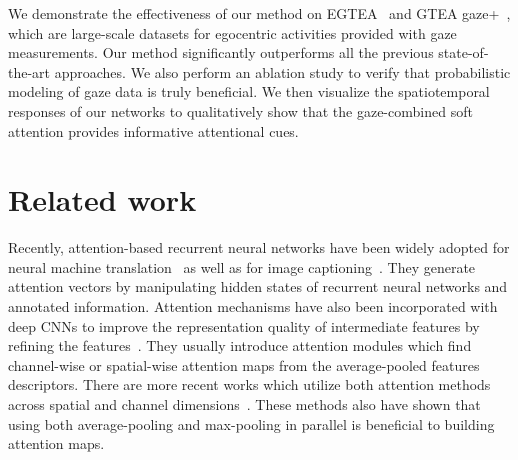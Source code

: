\documentclass[10pt,twocolumn,letterpaper]{article}
\begin{document}
We demonstrate the effectiveness of our method on EGTEA~\cite{li2018eye} and GTEA gaze+~\cite{li2015delving}, which are large-scale datasets for egocentric activities provided with gaze measurements. Our method significantly outperforms all the previous state-of-the-art approaches. We also perform an ablation study to verify that probabilistic modeling of gaze data is truly beneficial. We then visualize the spatiotemporal responses of our networks to qualitatively show that the gaze-combined soft attention provides informative attentional cues.

\section{Related work} \label{sec:related}
Recently, attention-based recurrent neural networks have been widely adopted for neural machine translation~\cite{bahdanau2014neural,luong2015effective} as well as for image captioning~\cite{xu2015show}. They generate attention vectors by manipulating hidden states of recurrent neural networks and annotated information. Attention mechanisms have also been incorporated with deep CNNs to improve the representation quality of intermediate features by refining the features~\cite{xu2016ask,oktay2018attention,hu2018squeeze,zhang2018image}. They usually introduce attention modules which find channel-wise or spatial-wise attention maps from the average-pooled features descriptors. There are more recent works which utilize both attention methods across spatial and channel dimensions~\cite{woo2018cbam,suganuma2018attention}. These methods also have shown that using both average-pooling and max-pooling in parallel is beneficial to building attention maps.
\end{document}
